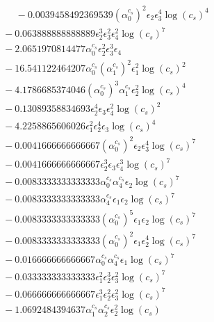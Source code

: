 \documentclass[10pt]{article}
\begin{document}
\begin{align*}
\phantom{F_{s,7}} &\phantom{={}}{}  - 0.0039458492369539 \left(\alpha_{0}^{c_s}\right)^{2} \epsilon_{2} \epsilon_{3}^{4} \log{\left(c_{s} \right)}^{4} \\
&{}  - 0.063888888888889 \epsilon_{2}^{3} \epsilon_{3}^{2} \epsilon_{4}^{2} \log{\left(c_{s} \right)}^{7} \\
&{}  - 2.0651970814477 \alpha_{0}^{c_s} \epsilon_{2}^{2} \epsilon_{3}^{3} \epsilon_{4} \\
&{}  - 16.541122464207 \alpha_{0}^{c_s} \left(\alpha_{1}^{c_s}\right)^{2} \epsilon_{1}^{2} \log{\left(c_{s} \right)}^{2} \\
&{}  - 4.1786685374046 \left(\alpha_{0}^{c_s}\right)^{3} \alpha_{1}^{c_s} \epsilon_{2}^{2} \log{\left(c_{s} \right)}^{4} \\
&{}  - 0.13089358834693 \epsilon_{2}^{4} \epsilon_{3} \epsilon_{4}^{2} \log{\left(c_{s} \right)}^{2} \\
&{}  - 4.2258865606026 \epsilon_{1}^{2} \epsilon_{2}^{4} \epsilon_{3} \log{\left(c_{s} \right)}^{4} \\
&{}  - 0.0041666666666667 \left(\alpha_{0}^{c_s}\right)^{2} \epsilon_{2} \epsilon_{3}^{4} \log{\left(c_{s} \right)}^{7} \\
&{}  - 0.0041666666666667 \epsilon_{2}^{3} \epsilon_{3} \epsilon_{4}^{3} \log{\left(c_{s} \right)}^{7} \\
&{}  - 0.0083333333333333 \alpha_{0}^{c_s} \alpha_{4}^{c_s} \epsilon_{2} \log{\left(c_{s} \right)}^{7} \\
&{}  - 0.0083333333333333 \alpha_{4}^{c_s} \epsilon_{1} \epsilon_{2} \log{\left(c_{s} \right)}^{7} \\
&{}  - 0.0083333333333333 \left(\alpha_{0}^{c_s}\right)^{5} \epsilon_{1} \epsilon_{2} \log{\left(c_{s} \right)}^{7} \\
&{}  - 0.0083333333333333 \left(\alpha_{0}^{c_s}\right)^{2} \epsilon_{1} \epsilon_{2}^{4} \log{\left(c_{s} \right)}^{7} \\
&{}  - 0.016666666666667 \alpha_{0}^{c_s} \alpha_{4}^{c_s} \epsilon_{1} \log{\left(c_{s} \right)}^{7} \\
&{}  - 0.033333333333333 \epsilon_{1}^{2} \epsilon_{2}^{3} \epsilon_{3}^{2} \log{\left(c_{s} \right)}^{7} \\
&{}  - 0.066666666666667 \epsilon_{1}^{3} \epsilon_{2}^{2} \epsilon_{3}^{2} \log{\left(c_{s} \right)}^{7} \\
&{}  - 1.0692484394637 \alpha_{1}^{c_s} \alpha_{2}^{c_s} \epsilon_{2}^{2} \log{\left(c_{s} \right)} \\

\end{align*}
\end{document}
